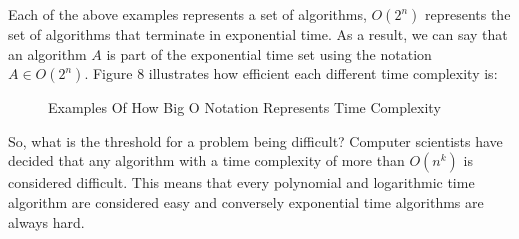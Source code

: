 \documentclass[twoside,10pt]{article}
\begin{document}
Each of the above examples represents a set of algorithms, $O(2^n)$ represents the set of algorithms that terminate in exponential time. As a result, we can say that an algorithm $A$ is part of the exponential time set using the notation $A\in O(2^n)$. Figure 8 illustrates how efficient each different time complexity is:
\begin{figure}[H]
\centering
{}
\caption{Examples Of How Big O Notation Represents Time Complexity}
\label{fig:ograph}
\end{figure}
So, what is the threshold for a problem being difficult? Computer scientists have decided that any algorithm with a time complexity of more than $O(n^k)$ is considered difficult. This means that every polynomial and logarithmic time algorithm are considered easy and conversely exponential time algorithms are always hard.
\end{document}
